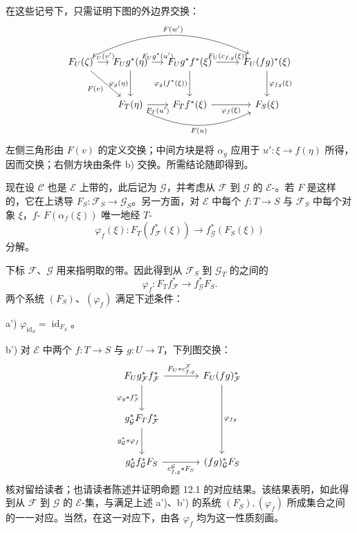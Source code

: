 在这些记号下，只需证明下图的外边界交换：
\[
\begin{tikzcd}[column sep=small,row sep=large]
 F_U(\zeta)\arrow[r,"F_U(v')"]\arrow[dr,"F(v)"']\arrow[rrrr,bend left=25,"F(w')"]&
 F_Ug^*(\eta)\arrow[r,"F_Ug^*(u')"]\arrow[d,"\varphi_g(\eta)"']&
 F_Ug^*f^*(\xi)\arrow[rr,"{F_U(c_{f,g}(\xi))}"]\arrow[d,"\varphi_g(f^*(\xi))"']&&
 F_U(fg)^*(\xi)\arrow[d,"\varphi_{fg}(\xi)"]\\
 &F_T(\eta)\arrow[r,"F_T(u')"']\arrow[rrr,bend right=25,"F(u)"']&
 F_Tf^*(\xi)\arrow[rr,"\varphi_f(\xi)"']&&F_S(\xi)
\end{tikzcd}
\]
左侧三角形由 $F(v)$ 的定义交换；中间方块是将 $\alpha_g$ 应用于 $u':\xi\to f(\eta)$ 所得，因而交换；右侧方块由条件 b) 交换。所需结论随即得到。

现在设 $\mathcal C$ 也是 $\mathcal E$ 上带的，此后记为 $\mathcal G$，并考虑从 $\mathcal F$ 到 $\mathcal G$ 的 $\mathcal E$-。若 $F$ 是这样的，它在上诱导 $F_S:\mathcal F_S\to\mathcal G_S$。另一方面，对 $\mathcal E$ 中每个 $f:T\to S$ 与 $\mathcal F_S$ 中每个对象 $\xi$，$f$- $F(\alpha_f(\xi))$ 唯一地经 $T$-
\[
 \varphi_f(\xi):F_T(f^*_{\mathcal F}(\xi))\longrightarrow f^*_{\mathcal G}(F_S(\xi))
\]
分解。

下标 $\mathcal F$、$\mathcal G$ 用来指明取的带。因此得到从 $\mathcal F_S$ 到 $\mathcal G_T$ 的之间的
\[
 \varphi_f:F_Tf^*_{\mathcal F}\longrightarrow f^*_{\mathcal G}F_S.
\]
两个系统 $(F_S)$、$(\varphi_f)$ 满足下述条件：

a') $\varphi_{\operatorname{id}_S}=\operatorname{id}_{F_S}$。

b') 对 $\mathcal E$ 中两个 $f:T\to S$ 与 $g:U\to T$，下列图交换：
\[
\begin{tikzcd}[column sep=large,row sep=large]
 F_Ug^*_{\mathcal F}f^*_{\mathcal F}\arrow[r,"{F_U*c^{\mathcal F}_{f,g}}"]\arrow[d,"\varphi_g*f^*_{\mathcal F}"']&
 F_U(fg)^*_{\mathcal F}\arrow[dd,"\varphi_{fg}"]\\
 g^*_{\mathcal G}F_Tf^*_{\mathcal F}\arrow[d,"g^*_{\mathcal G}*\varphi_f"']&\\
 g^*_{\mathcal G}f^*_{\mathcal G}F_S\arrow[r,"{c^{\mathcal G}_{f,g}*F_S}"']&(fg)^*_{\mathcal G}F_S
\end{tikzcd}
\]
核对留给读者；也请读者陈述并证明命题 12.1 的对应结果。该结果表明，如此得到从 $\mathcal F$ 到 $\mathcal G$ 的 $\mathcal E$-集，与满足上述 a')、b') 的系统 $(F_S),(\varphi_f)$ 所成集合之间的一一对应。当然，在这一对应下，由各 $\varphi_f$ 均为这一性质刻画。

